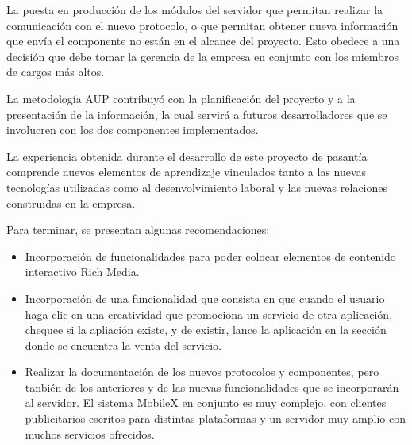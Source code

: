 La puesta en producción de los módulos del servidor que permitan realizar
la comunicación con el nuevo protocolo, o que permitan obtener nueva
información que envía el componente no están en el alcance del proyecto.
Esto obedece a una decisión que debe tomar la gerencia de la empresa
en conjunto con los miembros de cargos más altos.

La metodología AUP contribuyó con la planificación del proyecto y
a la presentación de la información, la cual servirá a futuros desarrolladores
que se involucren con los dos componentes implementados.

La experiencia obtenida durante el desarrollo de este proyecto de
pasantía comprende nuevos elementos de aprendizaje vinculados tanto
a las nuevas tecnologías utilizadas como al desenvolvimiento laboral
y las nuevas relaciones construidas en la empresa.

Para terminar, se presentan algunas recomendaciones:
\begin{itemize}
\item Incorporación de funcionalidades para poder colocar elementos de contenido
interactivo Rich Media.
\item Incorporación de una funcionalidad que consista en que cuando el usuario
haga clic en una creatividad que promociona un servicio de otra aplicación,
chequee si la apliación existe, y de existir, lance la aplicación
en la sección donde se encuentra la venta del servicio.
\item Realizar la documentación de los nuevos protocolos y componentes,
pero tanbién de los anteriores y de las nuevas funcionalidades que
se incorporarán al servidor. El sistema MobileX en conjunto es muy
complejo, con clientes publicitarios escritos para distintas plataformas
y un servidor muy amplio con muchos servicios ofrecidos.
\end{itemize}
\begin{onehalfspace}
\newpage{}\end{onehalfspace}
